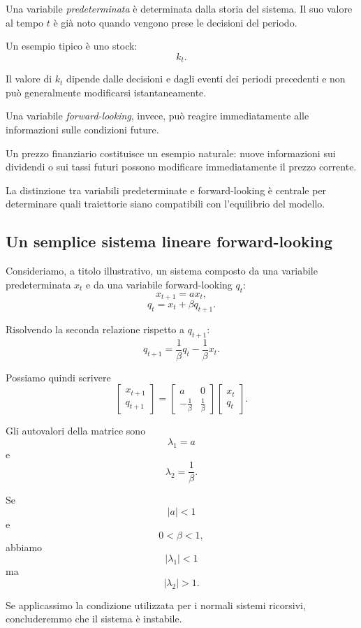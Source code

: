 \documentclass{book}
\begin{document}
Una variabile \emph{predeterminata} è determinata dalla storia del sistema.
Il suo valore al tempo $t$ è già noto quando vengono prese le decisioni
del periodo.

Un esempio tipico è uno stock:
\[
k_t.
\]

Il valore di $k_t$ dipende dalle decisioni e dagli eventi dei periodi
precedenti e non può generalmente modificarsi istantaneamente.

Una variabile \emph{forward-looking}, invece, può reagire immediatamente
alle informazioni sulle condizioni future.

Un prezzo finanziario costituisce un esempio naturale: nuove informazioni
sui dividendi o sui tassi futuri possono modificare immediatamente il
prezzo corrente.

La distinzione tra variabili predeterminate e forward-looking è centrale
per determinare quali traiettorie siano compatibili con l'equilibrio del
modello.


\subsection{Un semplice sistema lineare forward-looking}

Consideriamo, a titolo illustrativo, un sistema composto da una variabile
predeterminata $x_t$ e da una variabile forward-looking $q_t$:
\[
x_{t+1}=a x_t,
\]
\[
q_t=x_t+\beta q_{t+1}.
\]

Risolvendo la seconda relazione rispetto a $q_{t+1}$:
\[
q_{t+1}
=
\frac{1}{\beta}q_t
-
\frac{1}{\beta}x_t.
\]

Possiamo quindi scrivere
\[
\begin{bmatrix}
x_{t+1}\\
q_{t+1}
\end{bmatrix}
=
\begin{bmatrix}
a&0\\
-\frac{1}{\beta}&\frac{1}{\beta}
\end{bmatrix}
\begin{bmatrix}
x_t\\
q_t
\end{bmatrix}.
\]

Gli autovalori della matrice sono
\[
\lambda_1=a
\]
e
\[
\lambda_2=\frac{1}{\beta}.
\]

Se
\[
|a|<1
\]
e
\[
0<\beta<1,
\]
abbiamo
\[
|\lambda_1|<1
\]
ma
\[
|\lambda_2|>1.
\]

Se applicassimo la condizione utilizzata per i normali sistemi
ricorsivi, concluderemmo che il sistema è instabile.
\end{document}
